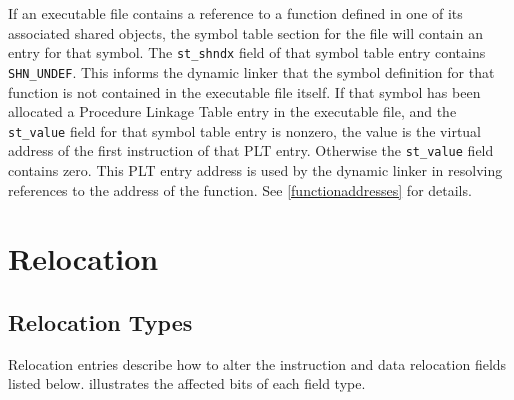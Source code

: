\documentclass[USenglish,fontsize=11pt,twoside,%
  toc=bib,toc=idx,toc=graduated,numbers=noendperiod,
  bookmarks=true,
  bookmarksnumbered=true,
  bookmarksopen=true,
  bookmarksopenlevel=1,
  breaklinks=true,
  colorlinks=true,
  linkcolor=black,
  pdfpagelayout={TwoPageRight},
  pdfusetitle=true
]{scrreprt}
\begin{document}
If an executable file contains a reference to a function defined in
one of its associated shared objects, the symbol table section for the
file will contain an entry for that symbol.  The \texttt{st\_shndx}
field of that symbol table entry contains \texttt{SHN\_UNDEF}.  This
informs the dynamic linker that the symbol definition for that
function is not contained in the executable file itself.  If that
symbol has been allocated a Procedure Linkage Table entry in the
executable file, and the \texttt{st\_value} field for that symbol
table entry is nonzero, the value is the virtual address of the first
instruction of that PLT entry.  Otherwise the \texttt{st\_value} field
contains zero.  This PLT entry address is used by the dynamic linker
in resolving references to the address of the function.  See
\cref{functionaddresses} for details.

\section{Relocation}
\subsection{Relocation Types}
Relocation entries describe how to alter the instruction and data
relocation fields listed below.   illustrates the
affected bits of each field type.
\end{document}
